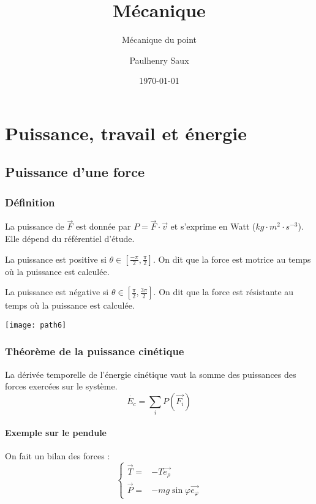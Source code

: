 \documentclass[french]{yLectureNote}
\title{Mécanique}
\subtitle{Mécanique du point}
\author{Paulhenry Saux}
\date{\today}
\renewcommand{\vec}{\overrightarrow}
\begin{document}
\setcounter{chapter}{7}
	\chapter{Puissance, travail et énergie}
\section{Puissance d'une force}
\subsection{Définition}
\begin{theorem}
La puissance de $\vec{F}$ est donnée par
$P = \vec{F}\cdot\vec{v}$ et s'exprime en Watt ($kg\cdot m^2\cdot s^{-3}$). Elle dépend du référentiel d'étude.
\end{theorem}
\begin{multicols}{2}
La puissance est positive si $\theta \in[\frac{-\pi}{2},\frac{\pi}{2}]$. On dit que la force est motrice au temps où la puissance est calculée.

La puissance est négative si $\theta \in[\frac{\pi}{2},\frac{3\pi}{2}]$. On dit que la force est résistante au temps où la puissance est calculée.

\columnbreak
\texttt{[image: path6]}
\end{multicols}
\subsection{Théorème de la puissance cinétique}
\begin{theorem}
La dérivée temporelle de l'énergie cinétique vaut la somme des puissances des forces exercées sur le système.
\[\dot{E_c} = \sum_i P(\vec{F_i})\]
\end{theorem}
\subsubsection{Exemple sur le pendule}
On fait un bilan des forces :
\[
 \left\{\begin{matrix}
\vec{T} =& -T\vec{e_{\rho}}\\
\vec{P} =& -mg\sin\varphi \vec{e_{\varphi}}
\end{matrix}\right.\]
\end{document}
